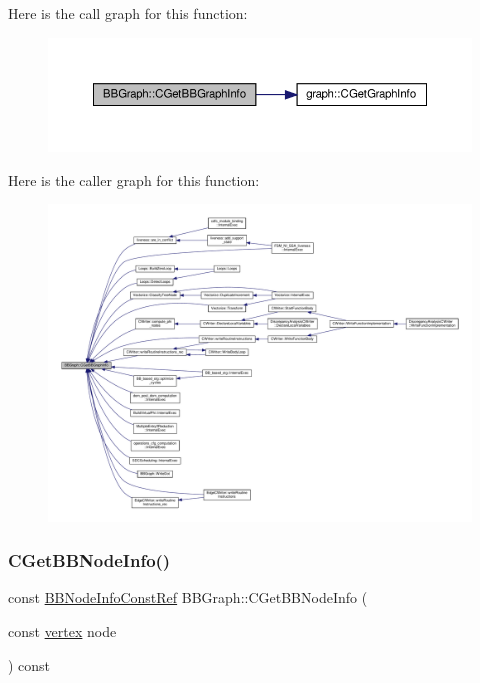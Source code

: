 Here is the call graph for this function\+:
\nopagebreak
\begin{figure}[H]
\begin{center}
\leavevmode
\includegraphics[width=350pt]{dd/d5f/structBBGraph_a3cd121592236889c951a9d35d39471e4_cgraph}
\end{center}
\end{figure}
Here is the caller graph for this function\+:
\nopagebreak
\begin{figure}[H]
\begin{center}
\leavevmode
\includegraphics[width=350pt]{dd/d5f/structBBGraph_a3cd121592236889c951a9d35d39471e4_icgraph}
\end{center}
\end{figure}
\mbox{\label{structBBGraph_ae12816f321950e50a70e772fd171f52e}} 
\subsubsection{\texorpdfstring{C\+Get\+B\+B\+Node\+Info()}{CGetBBNodeInfo()}}
{\footnotesize\ttfamily const \hyperlink{basic__block_8hpp_a72638f01c84faeea976a7a0cc2484a5d}{B\+B\+Node\+Info\+Const\+Ref} B\+B\+Graph\+::\+C\+Get\+B\+B\+Node\+Info (\begin{DoxyParamCaption}\item[{const \hyperlink{graph_8hpp_abefdcf0544e601805af44eca032cca14}{vertex}}]{node }\end{DoxyParamCaption}) const\hspace{0.3cm}{\ttfamily [inline]}}



